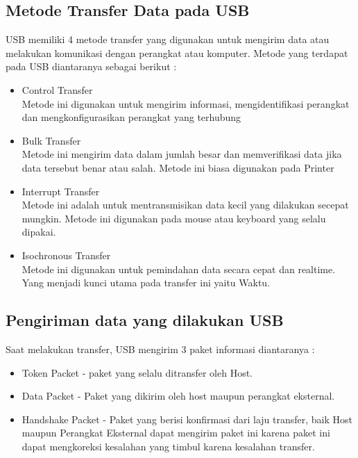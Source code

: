 \subsection{Metode Transfer Data pada USB}
USB memiliki 4 metode transfer yang digunakan untuk mengirim data atau melakukan komunikasi dengan perangkat atau komputer. Metode yang terdapat pada USB diantaranya sebagai berikut : 
\begin{itemize}
\item Control Transfer \\ Metode ini digunakan untuk mengirim informasi, mengidentifikasi perangkat dan mengkonfigurasikan perangkat yang terhubung
\item Bulk Transfer \\ Metode ini mengirim data dalam jumlah besar dan memverifikasi data jika data tersebut benar atau salah. Metode ini biasa digunakan pada Printer
\item Interrupt Transfer \\ Metode ini adalah untuk mentransmisikan data kecil yang dilakukan secepat mungkin. Metode ini digunakan pada mouse atau keyboard yang selalu dipakai.
\item Isochronous Transfer \\ Metode ini digunakan untuk pemindahan data secara cepat dan realtime. Yang menjadi kunci utama pada transfer ini yaitu Waktu.
\end{itemize}
\subsection{Pengiriman data yang dilakukan USB}
Saat melakukan transfer, USB mengirim 3 paket informasi diantaranya : 
\begin{itemize}
\item Token Packet - paket yang selalu ditransfer oleh Host.
\item Data Packet - Paket yang dikirim oleh host maupun perangkat eksternal.
\item Handshake Packet - Paket yang berisi konfirmasi dari laju transfer, baik Host maupun Perangkat Eksternal dapat mengirim paket ini karena paket ini dapat mengkoreksi kesalahan yang timbul karena kesalahan transfer.
\end{itemize}
